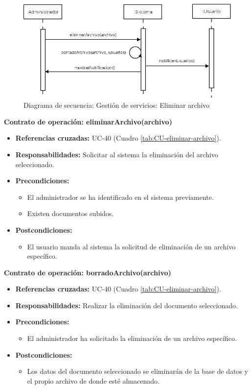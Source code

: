 \begin{figure}[H]
\centering
  \includegraphics[scale=.50]{img/secuencias/gestion-servicios-eliminar-archivo.jpeg}
  \caption{Diagrama de secuencia: Gestión de servicios: Eliminar archivo}
  \label{fig:secuencia-gestion-servicios-eliminar-archivo}
\end{figure}

\textbf{Contrato de operación: eliminarArchivo(archivo)}
\begin{itemize}
\item \textbf{Referencias cruzadas:} UC-40 (Cuadro \ref{tab:CU-eliminar-archivo}).
\item \textbf{Responsabilidades:} Solicitar al sistema la eliminación del archivo seleccionado.
\item \textbf{Precondiciones:} 
 \begin{itemize}
\item El administrador se ha identificado en el sistema previamente.
\item Existen documentos subidos.
\end {itemize}
\item \textbf{Postcondiciones:} 
 \begin{itemize}
\item El usuario manda al sistema la solicitud de eliminación de un archivo específico.
\end {itemize}
\end {itemize}

\textbf{Contrato de operación: borradoArchivo(archivo)}
\begin{itemize}
\item \textbf{Referencias cruzadas:} UC-40 (Cuadro \ref{tab:CU-eliminar-archivo}).
\item \textbf{Responsabilidades:} Realizar la eliminación del documento seleccionado.
\item \textbf{Precondiciones:} 
 \begin{itemize}
\item El administrador ha solicitado la eliminación de un archivo específico.
\end {itemize}
\item \textbf{Postcondiciones:} 
 \begin{itemize}
\item Los datos del documento seleccionado se eliminarán de la base de datos y el propio archivo de donde esté almacenado.
\end {itemize}
\end {itemize}

